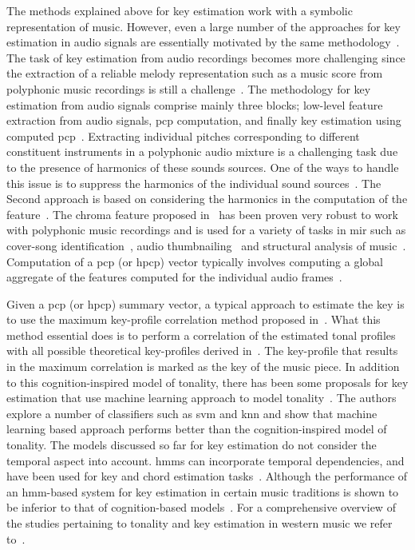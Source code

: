 {The methods explained above for key estimation work with a symbolic representation of music. However, even a large number of the approaches for key estimation in audio signals are essentially motivated by the same methodology~\citep{gomez2006tonal,pauws2004musical,peeters2006chroma}. The task of key estimation from audio recordings becomes more challenging since the extraction of a reliable melody representation such as a music score from polyphonic music recordings is still a challenge~\citep{gomez2006tonal}. The methodology for key estimation from audio signals comprise mainly three blocks; low-level feature extraction from audio signals, \gls{pcp} computation, and finally key estimation using computed \gls{pcp}~\cite{}. Extracting individual pitches corresponding to different constituent instruments in a polyphonic audio mixture is a challenging task due to the presence of harmonics of these sounds sources. One of the ways to handle this issue is to suppress the harmonics of the individual sound sources~\citep{cremer2004a,peeters2006chroma}. The Second approach is based on considering the harmonics in the computation of the feature~\citep{gomez2006tonal,izmirli2005template}. The chroma feature proposed in~\cite{gomez2006tonal} has been proven very robust to work with polyphonic music recordings and is used for a variety of tasks in \gls{mir} such as cover-song identification~\citep{joan_thesis}, audio thumbnailing~\citep{bartsch2001catch} and structural analysis of music~\citep{paulus2006music}. Computation of a \gls{pcp} (or \gls{hpcp}) vector typically involves computing a global aggregate of the features computed for the individual audio frames~\citep{izmirli2005template,pauws2004musical}. 

Given a \gls{pcp} (or \gls{hpcp}) summary vector, a typical approach to estimate the key is to use the maximum key-profile correlation method proposed in~\cite{krumhansl2001cognitive}. What this method essential does is to perform a correlation of the estimated tonal profiles with all possible theoretical key-profiles derived in~\cite{KrumhanslKessler82}. The key-profile that results in the maximum correlation is marked as the key of the music piece. In addition to this cognition-inspired model of tonality, there has been some proposals for key estimation that use machine learning approach to model tonality~\citep{gomez2004estimating}. The authors explore a number of classifiers such as \gls{svm} and \gls{knn} and show that machine learning based approach performs better than the cognition-inspired model of tonality. The models discussed so far for key estimation do not consider the temporal aspect into account. \glspl{hmm} can incorporate temporal dependencies, and have been used for key and chord estimation tasks~\cite{noland2006key,peeters2006musical,papadopoulos2007large}. Although the performance of an \gls{hmm}-based system for key estimation in certain music traditions is shown to be inferior to that of cognition-based models~\cite{peeters2006musical}. For a comprehensive overview of the studies pertaining to tonality and key estimation in western music we refer to~\cite{gomez2006tonal}.

}
